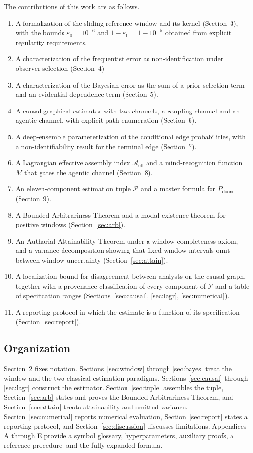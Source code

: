 \documentclass[11pt]{article}
\theoremstyle{remark}
\newcommand{\PD}{P_{\mathrm{doom}}}
\newcommand{\Aeff}{\mathcal{A}_{\mathrm{eff}}}
\newcommand{\eone}{\varepsilon_1}
\newcommand{\ezero}{\varepsilon_0}
\begin{document}
The contributions of this work are as follows.
\begin{enumerate}[label=(C\arabic*),leftmargin=3em]
  \item A formalization of the sliding reference window and its kernel (Section~3), with the bounds $\ezero=10^{-6}$ and $1-\eone=1-10^{-5}$ obtained from explicit regularity requirements.
  \item A characterization of the frequentist error as non-identification under observer selection (Section~4).
  \item A characterization of the Bayesian error as the sum of a prior-selection term and an evidential-dependence term (Section~5).
  \item A causal-graphical estimator with two channels, a coupling channel and an agentic channel, with explicit path enumeration (Section~6).
  \item A deep-ensemble parameterization of the conditional edge probabilities, with a non-identifiability result for the terminal edge (Section~7).
  \item A Lagrangian effective assembly index $\Aeff$ and a mind-recognition function $M$ that gates the agentic channel (Section~8).
  \item An eleven-component estimation tuple $\mathcal{P}$ and a master formula for $\PD$ (Section~9).
  \item A Bounded Arbitrariness Theorem and a modal existence theorem for positive windows (Section~\ref{sec:arb}).
  \item An Authorial Attainability Theorem under a window-completeness axiom, and a variance decomposition showing that fixed-window intervals omit between-window uncertainty (Section~\ref{sec:attain}).
  \item A localization bound for disagreement between analysts on the causal graph, together with a provenance classification of every component of $\mathcal{P}$ and a table of specification ranges (Sections~\ref{sec:causal}, \ref{sec:lagr}, \ref{sec:numerical}).
  \item A reporting protocol in which the estimate is a function of its specification (Section~\ref{sec:report}).
\end{enumerate}

\subsection{Organization}

Section~2 fixes notation. Sections~\ref{sec:window} through \ref{sec:bayes} treat the window and the two classical estimation paradigms. Sections~\ref{sec:causal} through \ref{sec:lagr} construct the estimator. Section~\ref{sec:tuple} assembles the tuple, Section~\ref{sec:arb} states and proves the Bounded Arbitrariness Theorem, and Section~\ref{sec:attain} treats attainability and omitted variance. Section~\ref{sec:numerical} reports numerical evaluation, Section~\ref{sec:report} states a reporting protocol, and Section~\ref{sec:discussion} discusses limitations. Appendices A through E provide a symbol glossary, hyperparameters, auxiliary proofs, a reference procedure, and the fully expanded formula.
\end{document}
